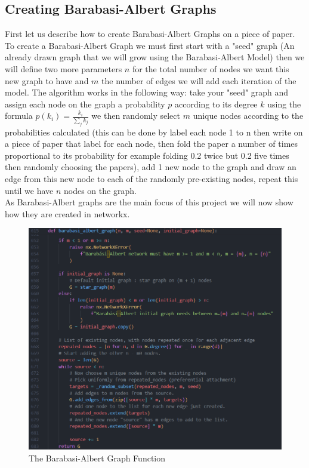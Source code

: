 \documentclass{article}
\begin{document}
        \subsection{Creating Barabasi-Albert Graphs}
        First let us describe how to create Barabasi-Albert Graphs on a piece of paper. To create a Barabasi-Albert Graph we must first start with a "seed" graph (An already drawn graph that we will grow using the Barabasi-Albert Model) then we will define two more parameters $n$ for the total number of nodes we want this new graph to have and $m$ the number of edges we will add each iteration of the model. The algorithm works in the following way: take your "seed" graph and assign each node on the graph a probability $p$ according to its degree $k$ using the formula $p(k_{i}) = \frac{k_{i}}{\sum_{j} {k_{j}}}$ we then randomly select $m$ unique nodes according to the probabilities calculated (this can be done by label each node 1 to n then write on a piece of paper that label for each node, then fold the paper a number of times proportional to its probability for example folding 0.2 twice but 0.2 five times then randomly choosing the papers), add 1 new node to the graph and draw an edge from this new node to each of the randomly pre-existing nodes, repeat this until we have $n$ nodes on the graph.\\
        As Barabasi-Albert graphs are the main focus of this project we will now show how they are created in networkx. 
        \begin{figure}[H]
            \includegraphics[width=12cm]{images/BARABASI_FUNC.png}
            \caption{The Barabasi-Albert Graph Function}
            \label{fig:Barabasi-Albert function1}
        \end{figure}
\end{document}

